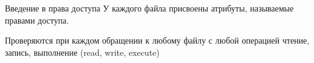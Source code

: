 \begin{frame}{Введение в права доступа}
  У каждого файла присвоены атрибуты, называемые \alert{правами доступа}.
  
  Проверяются при каждом обращении к любому файлу с любой операцией чтение, запись, выполнение (\alert{r}ead, \alert{w}rite, e\alert{x}ecute)

\end{frame}
